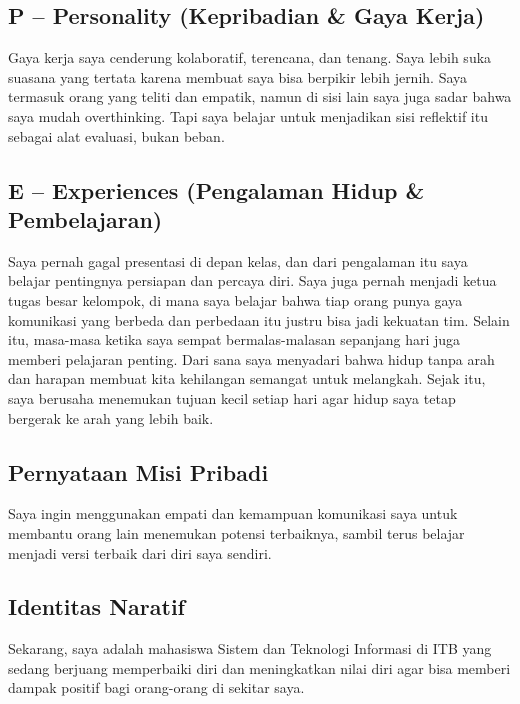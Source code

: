 \documentclass[
  letterpaper,
  DIV=11,
  numbers=noendperiod]{scrreprt}
\begin{document}
\subsection{P -- Personality (Kepribadian \& Gaya
Kerja)}\label{p-personality-kepribadian-gaya-kerja}

Gaya kerja saya cenderung kolaboratif, terencana, dan tenang. Saya lebih
suka suasana yang tertata karena membuat saya bisa berpikir lebih
jernih. Saya termasuk orang yang teliti dan empatik, namun di sisi lain
saya juga sadar bahwa saya mudah overthinking. Tapi saya belajar untuk
menjadikan sisi reflektif itu sebagai alat evaluasi, bukan beban.

\subsection{E -- Experiences (Pengalaman Hidup \&
Pembelajaran)}\label{e-experiences-pengalaman-hidup-pembelajaran}

Saya pernah gagal presentasi di depan kelas, dan dari pengalaman itu
saya belajar pentingnya persiapan dan percaya diri. Saya juga pernah
menjadi ketua tugas besar kelompok, di mana saya belajar bahwa tiap
orang punya gaya komunikasi yang berbeda dan perbedaan itu justru bisa
jadi kekuatan tim. Selain itu, masa-masa ketika saya sempat
bermalas-malasan sepanjang hari juga memberi pelajaran penting. Dari
sana saya menyadari bahwa hidup tanpa arah dan harapan membuat kita
kehilangan semangat untuk melangkah. Sejak itu, saya berusaha menemukan
tujuan kecil setiap hari agar hidup saya tetap bergerak ke arah yang
lebih baik.

\subsection{Pernyataan Misi Pribadi}\label{pernyataan-misi-pribadi}

Saya ingin menggunakan empati dan kemampuan komunikasi saya untuk
membantu orang lain menemukan potensi terbaiknya, sambil terus belajar
menjadi versi terbaik dari diri saya sendiri.

\subsection{Identitas Naratif}\label{identitas-naratif}

Sekarang, saya adalah mahasiswa Sistem dan Teknologi Informasi di ITB
yang sedang berjuang memperbaiki diri dan meningkatkan nilai diri agar
bisa memberi dampak positif bagi orang-orang di sekitar saya.
\end{document}
